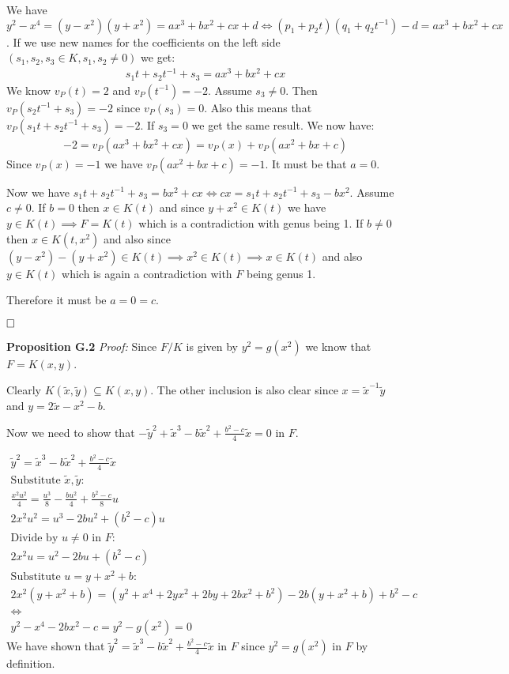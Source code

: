 \documentclass[12pt, a4paper]{article}
\newcommand{\qed}{\hfill\square}
\begin{document}
We have $y^2-x^4=(y-x^2)(y+x^2)=ax^3+bx^2+cx+d \iff (p_1+p_2t)(q_1+q_2t^{-1})-d = ax^3+bx^2+cx$. If we use new names for the coefficients on the left side $(s_1,s_2,s_3 \in K, s_1,s_2 \neq 0)$
 we get:
\begin{gather*}
s_1t+s_2t^{-1}+s_3 = ax^3+bx^2+cx
\end{gather*}
We know $v_P(t)=2$ and $v_P(t^{-1})=-2$. Assume $s_3 \neq 0$. Then $v_P(s_2t^{-1}+s_3) = -2$ since $v_P(s_3) = 0$. Also this means that $v_P(s_1t+s_2t^{-1}+s_3)=-2$. If $s_3=0$ we get the same result. We now have:
\begin{gather*}
-2=v_P(ax^3+bx^2+cx) = v_P(x)+v_P(ax^2+bx+c)
\end{gather*}
Since $v_P(x)=-1$ we have $v_P(ax^2+bx+c) = -1$. It must be that $a=0$.

Now we have $s_1t+s_2t^{-1}+s_3 = bx^2+cx \iff cx = s_1t+s_2t^{-1}+s_3-bx^2$. Assume $c \neq 0$. If $b=0$ then $x \in K(t)$ and since $y+x^2 \in K(t)$ we have $y \in K(t) \implies F=K(t)$ which is a contradiction with genus being 1. If $b \neq 0$ then $x \in K(t,x^2)$ and also since $(y-x^2)-(y+x^2) \in K(t) \implies x^2 \in K(t) \implies x \in K(t)$ and also $y \in K(t)$ which is again a contradiction with $F$ being genus 1.

Therefore it must be $a=0=c$.

$\qed$

\textbf{Proposition G.2} \textit{Proof:}
Since $F/K$ is given by $y^2 = g(x^2)$ we know that $F=K(x,y)$.

Clearly $K(\tilde{x},\tilde{y}) \subseteq K(x,y)$. The other inclusion is also clear since $x = \tilde{x}^{-1}\tilde{y}$ and $y = 2\tilde{x}-x^2-b$. 

Now we need to show that $-\tilde{y}^2+\tilde{x}^3-b\tilde{x}^2+\frac{b^2-c}{4}\tilde{x} = 0$ in $F$.

\begin{gather*}
\tilde{y}^2 = \tilde{x}^3-b\tilde{x}^2+\frac{b^2-c}{4}\tilde{x}\\
\text{Substitute $\tilde{x}, \tilde{y}$:}\\
\frac{x^2u^2}{4} = \frac{u^3}{8} - \frac{bu^2}{4} + \frac{b^2-c}{8}u\\
2x^2u^2 = u^3 - 2bu^2 + (b^2-c)u \\
\text{Divide by $u \neq 0$ in $F$:}\\
2x^2u = u^2 - 2bu + (b^2-c)\\
\text{Substitute $u=y+x^2+b$:}\\
2x^2(y+x^2+b) = (y^2+x^4+2yx^2+2by+2bx^2+b^2)-2b(y+x^2+b)+b^2-c\\
\iff\\
y^2-x^4-2bx^2-c = y^2 - g(x^2)= 0
\end{gather*}
We have shown that $\tilde{y}^2 = \tilde{x}^3-b\tilde{x}^2+\frac{b^2-c}{4}\tilde{x}$ in $F$ since $y^2=g(x^2)$ in $F$ by definition.
\end{document}
